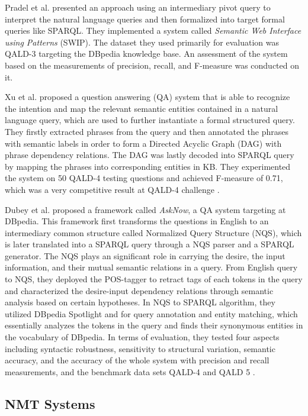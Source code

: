 Pradel et al. \cite{Pradel2013} presented an approach using an intermediary pivot query to interpret the natural language queries and then formalized into target formal queries like SPARQL. They implemented a system called \textit{Semantic Web Interface using Patterns} (SWIP). The dataset they used primarily for evaluation was QALD-3 targeting the DBpedia knowledge base. An assessment of the system based on the measurements of precision, recall, and F-measure was conducted on it. 

Xu et al. \cite{Xu2014} proposed a question answering (QA) system that is able to recognize the intention and map the relevant semantic entities contained in a natural language query, which are used to further instantiate a formal structured query. They firstly extracted phrases from the query and then  annotated the phrases with semantic labels in order to form a Directed Acyclic Graph (DAG) with phrase dependency relations. The DAG was lastly decoded into SPARQL query by mapping the phrases into corresponding entities in KB. They experimented the system on 50 QALD-4 testing questions and achieved F-measure of 0.71, which was a very competitive result at QALD-4 challenge \cite{unger:hal-01086472}.

Dubey et al. \cite{Dubey2016} proposed a framework called \textit{AskNow}, a QA system targeting at DBpedia. This framework first transforms the questions in English to an intermediary common structure called Normalized Query Structure (NQS), which is later translated into a SPARQL query through a NQS parser and a SPARQL generator. The NQS plays an significant role in carrying the desire, the input information, and their mutual semantic relations in a query. From English query to NQS, they deployed the POS-tagger to retract tags of each tokens in the query and characterized the desire-input dependency relations through semantic analysis based on certain hypotheses. In NQS to SPARQL algorithm, they utilized DBpedia Spotlight \cite{isem2013daiber} and  \cite{Miller:1995:WLD:219717.219748} for query annotation and entity matching, which essentially analyzes the tokens in the query and finds their synonymous entities in the vocabulary of DBpedia. In terms of evaluation, they tested four aspects including syntactic robustness, sensitivity to structural variation, semantic accuracy, and the accuracy of the whole system with precision and recall measurements, and the benchmark data sets QALD-4 and QALD 5 \cite{unger:hal-01086472,Unger2015}.

\subsection{NMT Systems} \label{subsection:related work with nmt}


